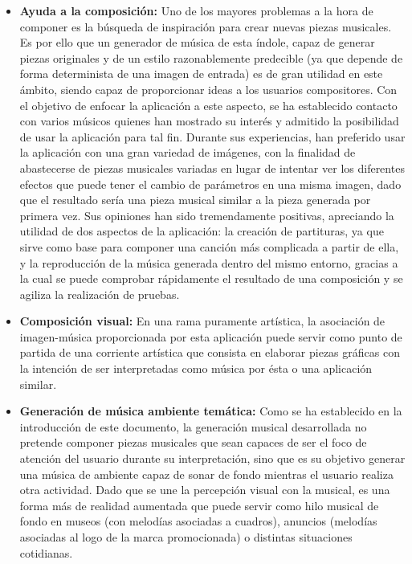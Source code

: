 \begin{itemize} 

\item\textbf{Ayuda a la composición:} Uno de los mayores problemas a la hora de componer es la búsqueda de inspiración para crear nuevas piezas musicales. Es por ello que un generador de música de esta índole, capaz de generar piezas originales y de un estilo razonablemente predecible (ya que depende de forma determinista de una imagen de entrada) es de gran utilidad en  este ámbito, siendo capaz de proporcionar ideas a los usuarios compositores. Con el objetivo de enfocar la aplicación a este aspecto, se ha establecido contacto con varios músicos quienes han mostrado su interés y admitido la posibilidad de usar la aplicación para tal fin. Durante sus experiencias, han preferido usar la aplicación con una gran variedad de imágenes, con la finalidad de abastecerse de piezas musicales variadas en lugar de intentar ver los diferentes efectos que puede tener el cambio de parámetros en una misma imagen, dado que el resultado sería una pieza musical similar a la pieza generada por primera vez. Sus opiniones han sido tremendamente positivas, apreciando la utilidad de dos aspectos de la aplicación: la creación de partituras, ya que sirve como base para componer una canción más complicada a partir de ella, y la reproducción de la música generada dentro del mismo entorno, gracias a la cual se puede comprobar rápidamente el resultado de una composición y se agiliza la realización de pruebas.

\item\textbf{Composición visual:} En una rama puramente artística, la asociación de imagen-música proporcionada por esta aplicación puede servir como punto de partida de una corriente artística que consista en elaborar piezas gráficas con la intención de ser interpretadas como música por ésta o una aplicación similar.


\item\textbf{Generación de música ambiente temática:} Como se ha establecido en la introducción de este documento, la generación musical desarrollada no pretende componer piezas musicales que sean capaces de ser el foco de atención del usuario durante su interpretación, sino que es su objetivo generar una música de ambiente capaz de sonar de fondo mientras el usuario realiza otra actividad. Dado que se une la percepción visual con la musical, es una forma más de realidad aumentada que puede servir como hilo musical de fondo en museos (con melodías asociadas a cuadros), anuncios (melodías asociadas al logo de la marca promocionada) o distintas situaciones cotidianas.


\end{itemize}
